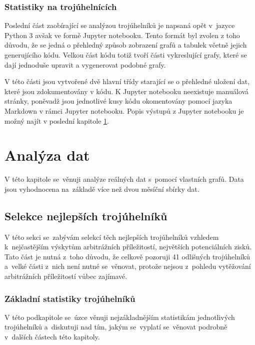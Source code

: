\documentclass[thesis=B,czech]{FITthesis}[2019/03/21]
\begin{document}
\subsection{Statistiky na trojúhelnících}
Poslední část zaobírající se analýzou trojúhelníků je napsaná opět v~jazyce Python 3 avšak ve formě Jupyter notebooku. Tento formát byl zvolen z toho důvodu, že se jedná o přehledný způsob zobrazení grafů a tabulek včetně jejich generujícího kódu. Velkou část kódu totiž tvoří části vykreslující grafy, které se dají jednoduše upravit a vygenerovat podobné grafy.

V této části jsou vytvořené dvě hlavní třídy starající se o přehledné uložení dat, které jsou zdokumentovány v kódu. K Jupyter notebooku neexistuje manuálová stránky, poněvadž jsou jednotlivé kusy kódu okomentovány pomocí jazyka Markdown v rámci Jupyter notebooku. Popis výstupů z Jupyter notebooku je možný najít v poslední kapitole \ref{chapter:analyza_dat}.



\chapter{Analýza dat}
\label{chapter:analyza_dat}
V této kapitole se~věnuji analýze  reálných dat s~pomocí vlastních grafů. Data jsou vyhodnocena na~základě více než dvou měsíční sbírky dat.

\section{Selekce nejlepších trojúhelníků}
V této sekci se~zabývám selekcí těch nejlepších trojúhelníků vzhledem \linebreak k~nejčastějším výskytům arbitrážních příležitostí, největších potenciálních \linebreak zisků. Tato část je nutná z~toho důvodu, že celkově pozoruji 41 odlišných trojúhelníků a~velké části z~nich není nutné se~věnovat, protože nejsou z~pohledu vytěžování arbitrážních příležitostí vůbec zajímavé.

\subsection{Základní statistiky trojúhelníků}
V této podkapitole se~úzce věnuji nejzákladnějším statistikám jednotlivých trojúhelníků a~diskutuji nad tím, jakým se~vyplatí se~věnovat podrobně \linebreak v~dalších částech této kapitoly.
\end{document}
